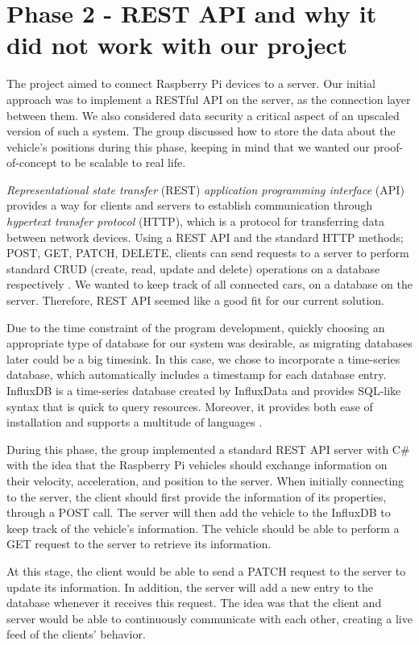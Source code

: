
\section{Phase 2 - REST API and why it did not work with our project}\label{phase2}
The project aimed to connect Raspberry Pi devices to a server.  Our initial approach was to implement a RESTful API on the server, as the connection layer between them. We also considered data security a critical aspect of an upscaled version of such a system. The group discussed how to store the data about the vehicle's positions during this phase, keeping in mind that we wanted our proof-of-concept to be scalable to real life.

\emph{Representational state transfer} (REST) \emph{application programming interface} (API) provides a way for clients and servers to establish communication through \emph{hypertext transfer protocol} (HTTP), which is a protocol for transferring data between network devices. Using a REST API and the standard HTTP methods; POST, GET, PATCH, DELETE, clients can send requests to a server to perform standard CRUD (create, read, update and delete) operations on a database respectively \parencite{rest_api}. We wanted to keep track of all connected cars, on a database on the server. Therefore, REST API seemed like a good fit for our current solution.

Due to the time constraint of the program development, quickly choosing an appropriate type of database for our system was desirable, as migrating databases later could be a big timesink. In this case, we chose to incorporate a time-series database, which automatically includes a timestamp for each database entry. InfluxDB is a time-series database created by InfluxData and provides SQL-like syntax that is quick to query resources. Moreover, it provides both ease of installation and supports a multitude of languages \parencite{influxdb}.

During this phase, the group implemented a standard REST API server with C\# with the idea that the Raspberry Pi vehicles should exchange information on their velocity, acceleration, and position to the server. When initially connecting to the server, the client should first provide the information of its properties, through a POST call. The server will then add the vehicle to the InfluxDB to keep track of the vehicle's information. The vehicle should be able to perform a GET request to the server to retrieve its information.

At this stage, the client would be able to send a PATCH request to the server to update its information. In addition, the server will add a new entry to the database whenever it receives this request. The idea was that the client and server would be able to continuously communicate with each other, creating a live feed of the clients' behavior.

